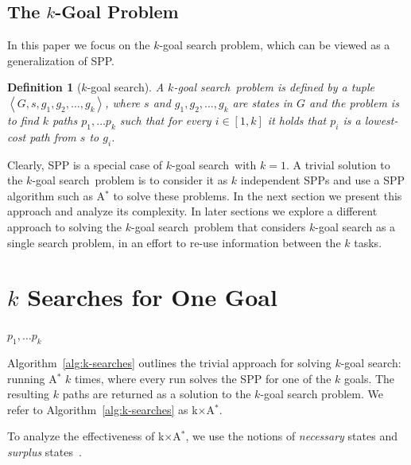 \documentclass{aicom2e}
\newtheorem{definition}{Definition}
\newcommand{\kgs}{$k$-goal search}
\newcommand{\astar}{A$^*$}
\newcommand{\kxastar}{k$\times$A$^*$}
\newcommand{\tuple}[1]{\ensuremath{\left \langle #1 \right \rangle }}
\newcommand{\roni}[1]{\textbf{[RS:#1]}}
\begin{document}
\subsection{The $k$-Goal Problem}
In this paper we focus on the $k$-goal search problem, which can be viewed as a generalization of SPP. 

\begin{definition}[$k$-goal search]
	A \kgs\ problem is defined by a tuple $\tuple{G,s, g_1, g_2, \ldots, g_k}$, 
	where $s$ and $g_1, g_2, \ldots, g_k$ are states in $G$ and the problem is to find 
	$k$ paths $p_1,\ldots p_k$ such that for every $i\in [1,k]$ it holds that $p_i$ is a lowest-cost path from $s$ to $g_i$. 
	\label{def:k-goal}
\end{definition}


Clearly, SPP is a special case of \kgs\ with $k=1$. A trivial solution to the \kgs\ problem is to consider it as $k$ independent SPPs and use a SPP algorithm such as \astar{} to solve these problems. In the next section we present this approach and analyze its complexity. 
In later sections we explore a different approach to solving the \kgs\ problem that considers \kgs{} as a single search problem, in an effort to re-use information between the $k$ tasks. 




\section{$k$ Searches for One Goal}
\label{sec:k-one-goal}
\begin{algorithm2e}[t!]
	\small
	\For{$i$=1 to $k$}{
		$p_i\gets$ \astar{}($s$,$g_i$)\\
	}
	\Return $p_1,\ldots p_k$\\	
	\caption{\kxastar{}: \kgs{} with $k$ \astar{}s}
	\label{alg:k-searches}
\end{algorithm2e}



Algorithm~\ref{alg:k-searches} outlines the trivial approach for solving \kgs{}: running \astar{} $k$ times, where every run solves the SPP for one of the $k$ goals. The resulting $k$ paths are returned as a solution to the \kgs{} problem. We refer to Algorithm~\ref{alg:k-searches} as \kxastar{}. 


To analyze the effectiveness of \kxastar{}, we use the notions of {\em necessary} states and {\em surplus} states~\cite{goldenberg2014enhanced}. 
\end{document}
